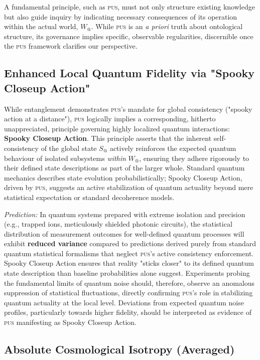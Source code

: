 \documentclass[11pt, a4paper]{article}
\makeatletter
\newcommand{\pus}{\textsc{pus}} %
\newcommand{\Wactual}{W_{@}} %
\newcommand{\Sactual}{S_{@}} %
\makeatother
\begin{document}
A fundamental principle, such as \pus, must not only structure existing knowledge but also guide inquiry by indicating necessary consequences of its operation within the actual world, $\Wactual$. While \pus{} is an \textit{a priori} truth about ontological structure, its governance implies specific, observable regularities, discernible once the \pus{} framework clarifies our perspective.

\subsection{Enhanced Local Quantum Fidelity via "Spooky Closeup Action"}

While entanglement demonstrates \pus's mandate for global consistency ("spooky action at a distance"), \pus{} logically implies a corresponding, hitherto unappreciated, principle governing highly localized quantum interactions: \textbf{Spooky Closeup Action}. This principle asserts that the inherent self-consistency of the global state $\Sactual$ actively reinforces the expected quantum behaviour of isolated subsystems \textit{within} $\Wactual$, ensuring they adhere rigorously to their defined state descriptions as part of the larger whole. Standard quantum mechanics describes state evolution probabilistically; Spooky Closeup Action, driven by \pus, suggests an active stabilization of quantum actuality beyond mere statistical expectation or standard decoherence models.

\textit{Prediction:} In quantum systems prepared with extreme isolation and precision (e.g., trapped ions, meticulously shielded photonic circuits), the statistical distribution of measurement outcomes for well-defined quantum processes will exhibit \textbf{reduced variance} compared to predictions derived purely from standard quantum statistical formalisms that neglect \pus's active consistency enforcement. Spooky Closeup Action ensures that reality "sticks closer" to its defined quantum state description than baseline probabilities alone suggest. Experiments probing the fundamental limits of quantum noise should, therefore, observe an anomalous suppression of statistical fluctuations, directly confirming \pus's role in stabilizing quantum actuality at the local level. Deviations from expected quantum noise profiles, particularly towards higher fidelity, should be interpreted as evidence of \pus{} manifesting as Spooky Closeup Action.

\subsection{Absolute Cosmological Isotropy (Averaged)}
\end{document}
